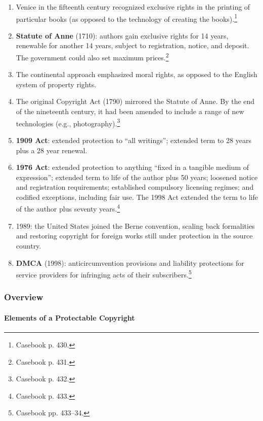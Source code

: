 \begin{enumerate}
    \item Venice in the fifteenth century recognized exclusive rights in the 
    printing of particular books (as opposed to the technology of creating the 
    books).\footnote{Casebook p. 430.}
    \item \textbf{Statute of Anne} (1710): authors gain exclusive rights for 
    14 years, renewable for another 14 years, subject to registration, notice, 
    and deposit. The government could also set maximum 
    prices.\footnote{Casebook p. 431.}
    \item The continental approach emphasized moral rights, as opposed to the 
    English system of property rights.
    \item The original Copyright Act (1790) mirrored the Statute of Anne. By 
    the end of the nineteenth century, it had been amended to include a range 
    of new technologies (e.g., photography).\footnote{Casebook p. 432.}
    \item \textbf{1909 Act}: extended protection to ``all writings''; extended 
    term to 28 years plus a 28 year renewal.
    \item \textbf{1976 Act}: extended protection to anything ``fixed in a 
    tangible medium of expression''; extended term to life of the author plus 
    50 years; loosened notice and registration requirements; established 
    compulsory licensing regimes; and codified exceptions, including fair use. 
    The 1998 Act extended the term to life of the author plus seventy 
    years.\footnote{Casebook p. 433.}
    \item 1989: the United States joined the Berne convention, scaling back 
    formalities and restoring copyright for foreign works still under 
    protection in the source country.
    \item \textbf{DMCA} (1998): anticircumvention provisions and liability 
    protections for service providers for infringing acts of their 
    subscribers.\footnote{Casebook pp. 433--34.}
\end{enumerate}

\subsubsection{Overview}

\paragraph{Elements of a Protectable Copyright}


